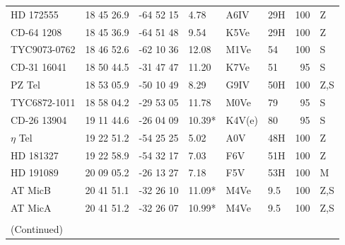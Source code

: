 \documentclass[11pt,twoside]{book}
\begin{document}
\begin{table}[]
{\begin{tabular}{lcclllrl}
HD 172555   &18 45 26.9     &-64 52 15      &\hspace{2mm}4.78  &A6IV  &29H&100&Z\\
CD-64 1208  &18 45 36.9     &-64 51 48      &\hspace{2mm}9.54  &K5Ve  &29H &100&Z\\
TYC9073-0762&18 46 52.6	    &-62 10 36	    &12.08   &M1Ve  &54&        100&S\\
CD-31 16041 &18 50 44.5	    &-31 47 47	    &11.20   &K7Ve  &51&        95&S\\
PZ Tel      &18 53 05.9	    &-50 10 49	    &\hspace{2mm}8.29  &G9IV  & 50H&100&Z,S\\
TYC6872-1011&18 58 04.2	    &-29 53 05	    &11.78   &M0Ve  &79&        95&S\\
CD-26 13904 &19 11 44.6	    &-26 04 09	    &10.39*  &K4V(e)&80&        95&S\\
$\eta$ Tel  &19 22 51.2     &-54 25 25      &\hspace{2mm}5.02  &A0V   &   48H&100&Z\\
HD 181327   &19 22 58.9     &-54 32 17      &\hspace{2mm}7.03  &F6V   &  51H&100&Z\\
HD 191089   &20 09 05.2     &-26 13 27      &\hspace{2mm}7.18  &F5V   &  53H&100 &M\\
AT MicB     &20 41 51.1	    &-32 26 10	    &11.09*  &M4Ve  &           9.5&100&Z,S\\
AT MicA     &20 41 51.2	    &-32 26 07	    &10.99*  &M4Ve	&       9.5&100&Z,S\\
\\
\smallskip
(Continued)
\end{tabular}
}
\end{table}
\end{document}

